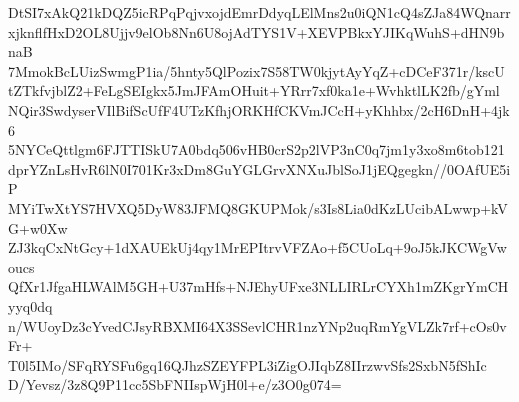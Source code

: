 DtSI7xAkQ21kDQZ5icRPqPqjvxojdEmrDdyqLElMns2u0iQN1cQ4sZJa84WQnarr
xjknflfHxD2OL8Ujjv9elOb8Nn6U8ojAdTYS1V+XEVPBkxYJIKqWuhS+dHN9bnaB
7MmokBcLUizSwmgP1ia/5hnty5QlPozix7S58TW0kjytAyYqZ+cDCeF371r/kscU
tZTkfvjblZ2+FeLgSEIgkx5JmJFAmOHuit+YRrr7xf0ka1e+WvhktlLK2fb/gYml
NQir3SwdyserVIlBifScUfF4UTzKfhjORKHfCKVmJCcH+yKhhbx/2cH6DnH+4jk6
5NYCeQttlgm6FJTTISkU7A0bdq506vHB0crS2p2lVP3nC0q7jm1y3xo8m6tob121
dprYZnLsHvR6lN0I701Kr3xDm8GuYGLGrvXNXuJblSoJ1jEQgegkn//0OAfUE5iP
MYiTwXtYS7HVXQ5DyW83JFMQ8GKUPMok/s3Is8Lia0dKzLUcibALwwp+kVG+w0Xw
ZJ3kqCxNtGcy+1dXAUEkUj4qy1MrEPItrvVFZAo+f5CUoLq+9oJ5kJKCWgVwoucs
QfXr1JfgaHLWAlM5GH+U37mHfs+NJEhyUFxe3NLLIRLrCYXh1mZKgrYmCHyyq0dq
n/WUoyDz3cYvedCJsyRBXMI64X3SSevlCHR1nzYNp2uqRmYgVLZk7rf+cOs0vFr+
T0l5IMo/SFqRYSFu6gq16QJhzSZEYFPL3iZigOJIqbZ8IIrzwvSfs2SxbN5fShIc
D/Yevsz/3z8Q9P11cc5SbFNIIspWjH0l+e/z3O0g074=
